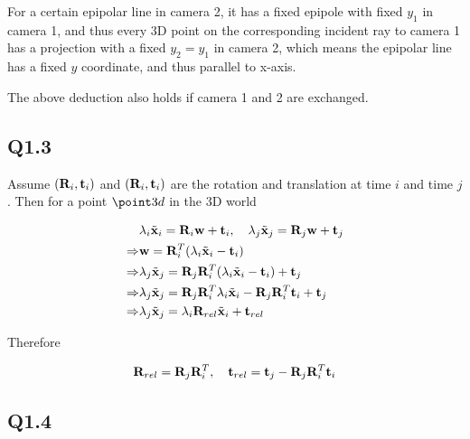 \documentclass[11pt]{article}
\begin{document}
For a certain epipolar line in camera 2, it has a fixed epipole with fixed $y_1$ in camera 1, and thus every 3D point on the corresponding incident ray to camera 1 has a projection with a fixed $y_2=y_1$ in camera 2, which means the epipolar line has a fixed $y$ coordinate, and thus parallel to x-axis.

The above deduction also holds if camera 1 and 2 are exchanged.

\newpage

\subsection*{Q1.3}

\newcommand{\pointw}{\mathbf{w}}

Assume $(\mathbf{R}_i, \mathbf{t}_i)$ and $(\mathbf{R}_i, \mathbf{t}_i)$ are the rotation and translation at time $i$ and time $j$. Then for a point $\point3d$ in the 3D world

\begin{align}
    & \lambda_i \homox_i = \rotation_i \pointw + \translation_i, \quad
    \lambda_j \homox_j = \rotation_j \pointw + \translation_j
    \nonumber \\ \Rightarrow &
    \pointw = \rotation_i ^T (\lambda_i \homox_i - \translation_i)
    \nonumber \\ \Rightarrow &
    \lambda_j \homox_j = \rotation_j \rotation_i ^T (\lambda_i \homox_i - \translation_i) + \translation_j
    \nonumber \\ \Rightarrow &
    \lambda_j \homox_j = \rotation_j \rotation_i ^T \lambda_i \homox_i - \rotation_j \rotation_i ^T \translation_i + \translation_j
    \nonumber \\ \Rightarrow &
    \lambda_j \homox_j = \lambda_i \rotation_{rel} \homox_i + \translation_{rel}
\end{align}

Therefore

\begin{align}
    \mathbf{R}_{rel} = \mathbf{R}_j \mathbf{R}_i ^T, \quad
    \mathbf{t}_{rel} = \mathbf{t}_j - \mathbf{R}_j \mathbf{R}_i ^T \mathbf{t}_i
\end{align}

\newpage

\subsection*{Q1.4}
\end{document}
